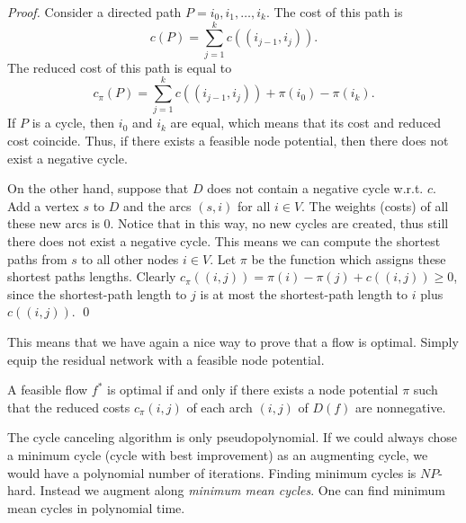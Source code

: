 \begin{proof}
  Consider a directed path $P = i_0,i_1,\ldots,i_k$. The cost of this
  path is 
  \begin{displaymath}
    c(P) = \sum_{j=1}^{k}c((i_{j-1},i_j)).
  \end{displaymath}
  The reduced cost of this path is equal to 
  \begin{displaymath}
    c_\pi(P) = \sum_{j=1}^{k}c((i_{j-1},i_j)) + \pi(i_0) - \pi(i_k).
  \end{displaymath}
  If $P$ is a cycle, then $i_0$ and $i_k$ are equal, which means that
  its cost and reduced cost coincide. Thus, if there exists a feasible
  node potential, then there does not exist a negative cycle. 

  
  On the other hand, suppose that $D$ does not contain a negative
  cycle w.r.t. $c$. Add a vertex $s$ to $D$ and the arcs $(s,i)$ for all 
  $i \in  V$. The weights (costs) of all these new arcs is $0$. Notice
  that in this way, no new cycles are created, thus still there does
  not exist a negative cycle. This means we can compute the shortest
  paths from $s$ to all other nodes $i \in V$. Let $\pi$ be the function
  which assigns these shortest paths lengths. Clearly $c_\pi((i,j)) =
  \pi(i) - \pi(j) + c((i,j))\geq0$, since the shortest-path length to $j$ is
  at most the shortest-path length to $i$ plus $c((i,j))$.  \qed
\end{proof}

  
This means that we have again a nice way to prove that a flow is
optimal. Simply equip  the residual network with a feasible node
potential.  



\begin{corollary}
  \label{co:1}
  A feasible flow $f^*$ is optimal if and only if there exists a node
  potential $\pi$ such that the reduced costs $c_\pi{(i,j)}$ of  each arch
  $(i,j)$ of $D(f)$ are nonnegative. 
\end{corollary}






  The cycle canceling algorithm is only pseudopolynomial. If we could
  always chose a minimum cycle (cycle with best improvement) as an
  augmenting cycle, we would have a polynomial number of
  iterations. Finding minimum cycles is $NP$-hard. Instead we augment
  along \emph{minimum mean cycles}. One can find minimum mean cycles
  in polynomial time.  

